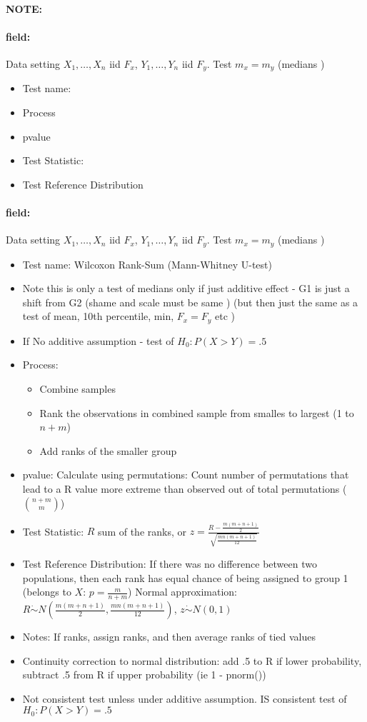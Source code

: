 \documentclass[12pt]{article}
\newenvironment{note}{\paragraph{NOTE:}}{}
\newenvironment{field}{\paragraph{field:}}{}
\begin{document}
  \begin{note}
    \begin{field}
    Data setting $X_1, \ldots , X_n$ iid $F_x$, $Y_1, \ldots, Y_n$ iid $F_y$. Test $m_x = m_y$ (medians )
    \begin{itemize}
      \item Test name:
      \item Process
      \item pvalue
      \item Test Statistic:
      \item Test Reference Distribution
    \end{itemize}
  \end{field}
  \begin{field}
  Data setting $X_1, \ldots , X_n$ iid $F_x$, $Y_1, \ldots, Y_n$ iid $F_y$. Test $m_x = m_y$ (medians )
  \begin{itemize}
    \item Test name: Wilcoxon Rank-Sum (Mann-Whitney U-test)
    \item Note this is only a test of medians only if just additive effect - G1 is just a shift from G2 (shame and scale must be same ) (but then just the same as a test of mean, 10th percentile, min, $F_x = F_y$ etc )
    \item If No additive assumption - test of $H_0: P(X > Y) = .5$
    \item Process:
    \begin{itemize}
      \item Combine samples
      \item Rank the observations in combined sample from smalles to largest (1 to $n + m$)
      \item Add ranks of the smaller group
    \end{itemize}
    \item pvalue: Calculate using permutations: Count number of permutations that lead to a R value more extreme than observed out of total permutations ($\binom{n+m}{m}$)
    \item Test Statistic: $R$ sum of the ranks, or $z = \frac{R - \frac{m(m+n+1)}{2}}{\sqrt{\frac{mn(m+n+1)}{12}}}$
    \item Test Reference Distribution: If there was no difference between two populations, then each rank has equal chance of being assigned to group 1 (belongs to $X$: $p = \frac{m}{n+m}$)
    Normal approximation: $R \dot\sim N( \frac{m(m+n+1)}{2}, \frac{mn(m+n+1)}{12})$, $z \dot\sim N(0,1)$
    \item Notes: If ranks, assign ranks, and then average ranks of tied values
    \item Continuity correction to normal distribution: add .5 to R if lower probability, subtract .5 from R if upper probability (ie 1 - pnorm())
    \item Not consistent test unless under additive assumption. IS consistent test of $H_0: P(X > Y) = .5$
  \end{itemize}
\end{field}
  \end{note}
\end{document}
